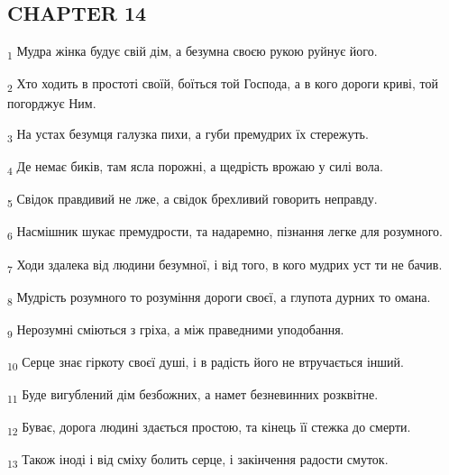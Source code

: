 \subsection{CHAPTER 14}
\begin{tcolorbox}
\textsubscript{1} Мудра жінка будує свій дім, а безумна своєю рукою руйнує його.
\end{tcolorbox}
\begin{tcolorbox}
\textsubscript{2} Хто ходить в простоті своїй, боїться той Господа, а в кого дороги криві, той погорджує Ним.
\end{tcolorbox}
\begin{tcolorbox}
\textsubscript{3} На устах безумця галузка пихи, а губи премудрих їх стережуть.
\end{tcolorbox}
\begin{tcolorbox}
\textsubscript{4} Де немає биків, там ясла порожні, а щедрість врожаю у силі вола.
\end{tcolorbox}
\begin{tcolorbox}
\textsubscript{5} Свідок правдивий не лже, а свідок брехливий говорить неправду.
\end{tcolorbox}
\begin{tcolorbox}
\textsubscript{6} Насмішник шукає премудрости, та надаремно, пізнання легке для розумного.
\end{tcolorbox}
\begin{tcolorbox}
\textsubscript{7} Ходи здалека від людини безумної, і від того, в кого мудрих уст ти не бачив.
\end{tcolorbox}
\begin{tcolorbox}
\textsubscript{8} Мудрість розумного то розуміння дороги своєї, а глупота дурних то омана.
\end{tcolorbox}
\begin{tcolorbox}
\textsubscript{9} Нерозумні сміються з гріха, а між праведними уподобання.
\end{tcolorbox}
\begin{tcolorbox}
\textsubscript{10} Серце знає гіркоту своєї душі, і в радість його не втручається інший.
\end{tcolorbox}
\begin{tcolorbox}
\textsubscript{11} Буде вигублений дім безбожних, а намет безневинних розквітне.
\end{tcolorbox}
\begin{tcolorbox}
\textsubscript{12} Буває, дорога людині здається простою, та кінець її стежка до смерти.
\end{tcolorbox}
\begin{tcolorbox}
\textsubscript{13} Також іноді і від сміху болить серце, і закінчення радости смуток.
\end{tcolorbox}
